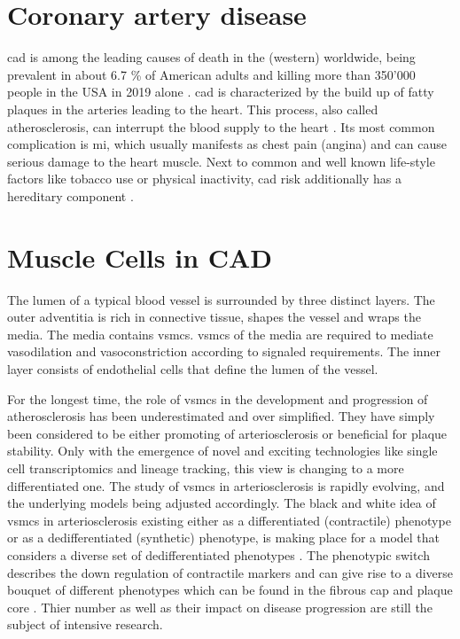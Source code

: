 \section{Coronary artery disease}
\label{sec:cad}
\Ac{cad} is among the leading causes of death in the (western) worldwide, being prevalent in about 6.7 \% of American adults and killing more than 350'000 people in the USA in 2019 alone \cite{centersfordiseasecontrolandpreventionHeartDiseaseFacts2022, fryarPrevalenceUncontrolledRisk2012}. \Ac{cad} is characterized by the build up of fatty plaques in the arteries leading to the heart. This process, also called atherosclerosis, can interrupt the blood supply to the heart \cite{nationalhealthserviceHeartAttack2017}. Its most common complication is \ac{mi}, which usually manifests as chest pain (angina) and can cause serious damage to the heart muscle.  Next to common and well known life-style factors like tobacco use or physical inactivity, \ac{cad} risk additionally has a hereditary component \cite{taskforcemembers2013ESCGuidelines2013}.


\section{Muscle Cells in CAD}
\label{sec:haosms}
The lumen of a typical blood vessel is surrounded by three distinct layers. The outer adventitia is rich in connective tissue, shapes the vessel and wraps the media. The media contains \acp{vsmc}. \Acp{vsmc} of the media are required to mediate vasodilation and vasoconstriction according to signaled requirements. The inner layer consists of endothelial cells that define the lumen of the vessel. \cite{tuckerAnatomyBloodVessels2022a, yapSixShadesVascular2021}

For the longest time, the role of \acp{vsmc} in the development and progression of atherosclerosis has been underestimated and over simplified. They have simply been considered to be either promoting of arteriosclerosis or beneficial for plaque stability. Only with the emergence of novel and exciting technologies like single cell transcriptomics and lineage tracking, this view is changing to a more differentiated one. \cite{grootaertVascularSmoothMuscle2021, yapSixShadesVascular2021} The study of \acp{vsmc} in arteriosclerosis is rapidly evolving, and the underlying models being adjusted accordingly. The black and white idea of \acp{vsmc} in arteriosclerosis existing either as a differentiated (contractile) phenotype or as a dedifferentiated (synthetic) phenotype, is making place for a model that considers a diverse set of dedifferentiated phenotypes \cite{grootaertVascularSmoothMuscle2021, yapSixShadesVascular2021}. The phenotypic switch describes the down regulation of contractile markers and can give rise to a diverse bouquet of different phenotypes which can be found in the fibrous cap and plaque core \cite{grootaertVascularSmoothMuscle2021}. Thier number as well as their impact on disease progression are still the subject of intensive research.

